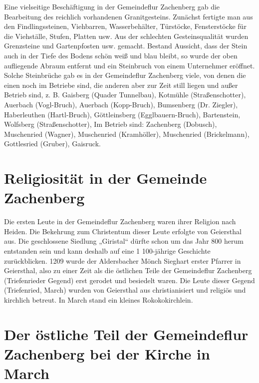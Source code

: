 \documentclass{book}
\begin{document}
Eine vielseitige Beschäftigung in der Gemeindeflur Zachenberg gab die
Bearbeitung des reichlich vorhandenen Granitgesteins. Zunächst fertigte man aus
den Findlingssteinen, Viehbarren, Wasserbehälter, Türstöcke, Fensterstöcke für
die Viehställe, Stufen, Platten usw. Aus der schlechten Gesteinsqualität wurden
Grenzsteine und Gartenpfosten usw. gemacht. Bestand Aussicht, dass der Stein
auch in der Tiefe des Bodens schön weiß und blau bleibt, so wurde der oben
aufliegende Abraum entfernt und ein Steinbruch von einem Unternehmer eröffnet.
Solche Steinbrüche gab es in der Gemeindeflur Zachenberg viele, von denen die
einen noch im Betriebe sind, die anderen aber zur Zeit still liegen und außer
Betrieb sind, z. B. Gaisberg (Quader Tunnelbau)‚ Kotmühle (Straßenschotter)‚
Auerbach (Vogl-Bruch), Auerbach (Kopp-Bruch), Bumsenberg (Dr. Ziegler),
Haberleuthen (Hartl-Bruch), Göttleinsberg (Egglbauern-Bruch), Bartenstein,
Wolfsberg (Straßenschotter), Im Betrieb sind: Zachenberg (Dobusch), Muschenried
(Wagner), Muschenried (Kramhöller), Muschenried (Brickelmann), Gottlesried
(Gruber), Gaisruck.

\section{Religiosität in der Gemeinde Zachenberg}

Die ersten Leute in der Gemeindeflur Zachenberg waren ihrer Religion nach
Heiden. Die Bekehrung zum Christentum dieser Leute erfolgte von Geiersthal aus.
Die geschlossene Siedlung „Giristal“ dürfte schon um das Jahr 800 herum
entstanden sein und kann deshalb auf eine 1 100-jährige Geschichte
zurückblicken. 1209 wurde der Aldersbacher Mönch Sieghart erster Pfarrer in
Geiersthal, also zu einer Zeit als die östlichen Teile der Gemeindeflur
Zachenberg (Triefenrieder Gegend) erst gerodet und besiedelt waren. Die Leute
dieser Gegend (Triefenried, March) wurden von Geiersthal aus christianisiert und
religiös und kirchlich betreut. In March stand ein kleines Rokokokirchlein.

\section{Der östliche Teil der Gemeindeflur Zachenberg bei der Kirche in March}
\end{document}
